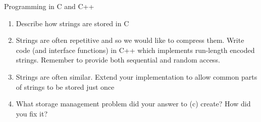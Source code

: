\documentclass{tripos}  %
\begin{document}
\begin{question}[MockIB,year=2024,paper=1,question=7,author=rrw]{Programming in C and C++}


  \begin{enumerate}
  \item Describe how strings are stored in C 
  \item Strings are often repetitive and so we would like to compress them. Write code (and interface functions) in C++ which implements run-length encoded strings. Remember to provide both sequential and random access. 
  \item Strings are often similar. Extend your implementation to allow common parts of strings to be stored just once 
  \item What storage management problem did your answer to (c) create? How did you fix it? 
  \end{enumerate}

\end{question}
\end{document}

